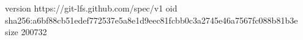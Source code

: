 version https://git-lfs.github.com/spec/v1
oid sha256:a6bf88cb51edef772537e5a8e1d9eec81fcbb0c3a2745e46a7567fc088b81b3e
size 200732
